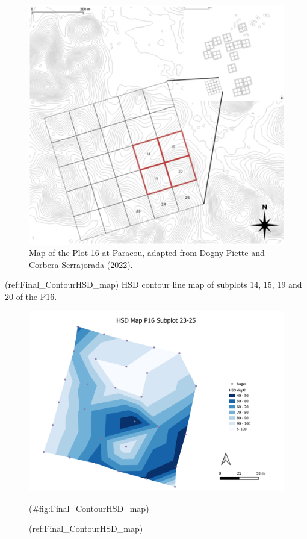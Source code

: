 \documentclass[fleqn,12pt]{latex/stylish_article} %
\begin{document}
\scriptsize

\begin{figure}

{\centering \includegraphics[width=0.9\linewidth]{images/paracouPlotLocation} 

}

\caption{Map of the Plot 16 at Paracou, adapted from Dogny Piette and Corbera Serrajorada (2022).}\label{fig:paracouPlotLocation}
\end{figure}

\normalsize

(ref:Final\_ContourHSD\_map) HSD contour line map of subplots 14, 15, 19 and 20 of the P16.

\scriptsize

\begin{figure}

{\centering \includegraphics[width=0.9\linewidth]{images/Final_ContourHSD_map} 

}

\caption{(ref:Final_ContourHSD_map)}(\#fig:Final_ContourHSD_map)
\end{figure}
\end{document}

